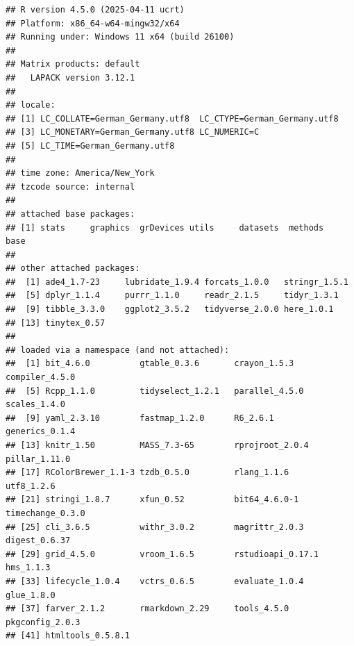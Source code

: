 \documentclass[
]{article}
\begin{document}
\begin{verbatim}
## R version 4.5.0 (2025-04-11 ucrt)
## Platform: x86_64-w64-mingw32/x64
## Running under: Windows 11 x64 (build 26100)
## 
## Matrix products: default
##   LAPACK version 3.12.1
## 
## locale:
## [1] LC_COLLATE=German_Germany.utf8  LC_CTYPE=German_Germany.utf8   
## [3] LC_MONETARY=German_Germany.utf8 LC_NUMERIC=C                   
## [5] LC_TIME=German_Germany.utf8    
## 
## time zone: America/New_York
## tzcode source: internal
## 
## attached base packages:
## [1] stats     graphics  grDevices utils     datasets  methods   base     
## 
## other attached packages:
##  [1] ade4_1.7-23     lubridate_1.9.4 forcats_1.0.0   stringr_1.5.1  
##  [5] dplyr_1.1.4     purrr_1.1.0     readr_2.1.5     tidyr_1.3.1    
##  [9] tibble_3.3.0    ggplot2_3.5.2   tidyverse_2.0.0 here_1.0.1     
## [13] tinytex_0.57   
## 
## loaded via a namespace (and not attached):
##  [1] bit_4.6.0          gtable_0.3.6       crayon_1.5.3       compiler_4.5.0    
##  [5] Rcpp_1.1.0         tidyselect_1.2.1   parallel_4.5.0     scales_1.4.0      
##  [9] yaml_2.3.10        fastmap_1.2.0      R6_2.6.1           generics_0.1.4    
## [13] knitr_1.50         MASS_7.3-65        rprojroot_2.0.4    pillar_1.11.0     
## [17] RColorBrewer_1.1-3 tzdb_0.5.0         rlang_1.1.6        utf8_1.2.6        
## [21] stringi_1.8.7      xfun_0.52          bit64_4.6.0-1      timechange_0.3.0  
## [25] cli_3.6.5          withr_3.0.2        magrittr_2.0.3     digest_0.6.37     
## [29] grid_4.5.0         vroom_1.6.5        rstudioapi_0.17.1  hms_1.1.3         
## [33] lifecycle_1.0.4    vctrs_0.6.5        evaluate_1.0.4     glue_1.8.0        
## [37] farver_2.1.2       rmarkdown_2.29     tools_4.5.0        pkgconfig_2.0.3   
## [41] htmltools_0.5.8.1
\end{verbatim}
\end{document}
